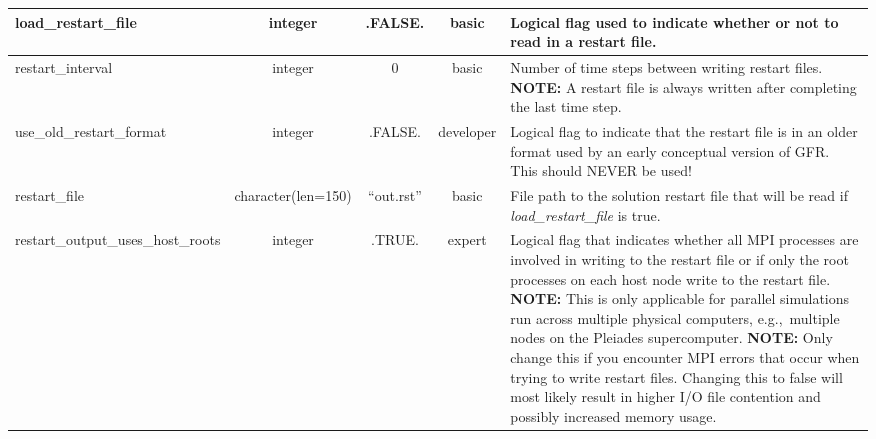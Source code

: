 \documentclass[letterpaper,10pt]{article}
\newcommand{\slbsc}{basic}
\newcommand{\slxpt}{expert}
\newcommand{\sldev}{developer}
\newcommand{\typint}{integer}
\newcommand{\typlog}{integer}
\newcommand{\tc}[1][150]{character(len=#1)}
\newcommand{\tru}{.TRUE.}
\newcommand{\fls}{.FALSE.}
\newcommand{\minorline}{\hline}
\newcommand{\groupline}[1]{}
\newlength{\colEwidth}
\newcommand{\descriptionbegin}{}
\newcommand{\descriptionend}{\\ \minorline}
\newcommand{\forexample}{e.g.,~}
\newcommand{\NOTE}{\newline \textcolor{OrangeRed3}{\textbf{NOTE: }}}
\begin{document}
\begin{longtable}{ | l | c | c | c | p{\colEwidth} | }
    \groupline{RESTART OPTIONS}
    load\_restart\_file                & \typlog & \fls        & \slbsc &
    \descriptionbegin
    Logical flag used to indicate whether or not to read in a restart file.
    \descriptionend
    restart\_interval                  & \typint & 0           & \slbsc &
    \descriptionbegin
    Number of time steps between writing restart files. \NOTE A restart
    file is always written after completing the last time step.
    \descriptionend
    use\_old\_restart\_format          & \typlog & \fls        & \sldev &
    \descriptionbegin
    Logical flag to indicate that the restart file is in an older format used by
    an early conceptual version of GFR. \newline This should NEVER be used!
    \descriptionend
    restart\_file                      & \tc     & ``out.rst'' & \slbsc &
    \descriptionbegin
    File path to the solution restart file that will be read if \newline
    \textsl{load\_restart\_file} is true.
    \descriptionend
    restart\_output\_uses\_host\_roots & \typlog & \tru        & \slxpt &
    \descriptionbegin
    Logical flag that indicates whether all MPI processes are involved in
    writing to the restart file or if only the root processes on each host node
    write to the restart file.
    \NOTE This is only applicable for parallel simulations run across
    multiple physical computers, \forexample multiple nodes on the Pleiades
    supercomputer.
    \NOTE Only change this if you encounter MPI errors that occur when
    trying to write restart files. Changing this to false will most likely
    result in higher I\slash O file contention and possibly increased memory
    usage.
    \descriptionend


\end{longtable}
\end{document}
